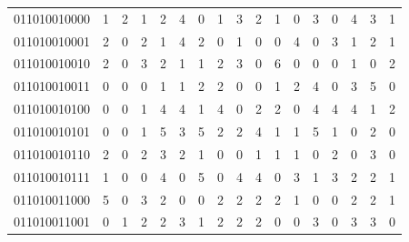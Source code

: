 \documentclass[10pt,a4paper]{article}
\begin{document}
\begin{longtable}{ |c|c|c|c|c|c|c|c|c|c|c|c|c|c|c|c|c| }
    011010010000              & 1                            & 2                                & 1                            & 2                              & 4   & 0   & 1   & 3   & 2   & 1   & 0   & 3   & 0   & 4   & 3   & 1   \\
    011010010001              & 2                            & 0                                & 2                            & 1                              & 4   & 2   & 0   & 1   & 0   & 0   & 4   & 0   & 3   & 1   & 2   & 1   \\
    011010010010              & 2                            & 0                                & 3                            & 2                              & 1   & 1   & 2   & 3   & 0   & 6   & 0   & 0   & 0   & 1   & 0   & 2   \\
    011010010011              & 0                            & 0                                & 0                            & 1                              & 1   & 2   & 2   & 0   & 0   & 1   & 2   & 4   & 0   & 3   & 5   & 0   \\
    011010010100              & 0                            & 0                                & 1                            & 4                              & 4   & 1   & 4   & 0   & 2   & 2   & 0   & 4   & 4   & 4   & 1   & 2   \\
    011010010101              & 0                            & 0                                & 1                            & 5                              & 3   & 5   & 2   & 2   & 4   & 1   & 1   & 5   & 1   & 0   & 2   & 0   \\
    011010010110              & 2                            & 0                                & 2                            & 3                              & 2   & 1   & 0   & 0   & 1   & 1   & 1   & 0   & 2   & 0   & 3   & 0   \\
    011010010111              & 1                            & 0                                & 0                            & 4                              & 0   & 5   & 0   & 4   & 4   & 0   & 3   & 1   & 3   & 2   & 2   & 1   \\
    011010011000              & 5                            & 0                                & 3                            & 2                              & 0   & 0   & 2   & 2   & 2   & 2   & 1   & 0   & 0   & 2   & 2   & 1   \\
    011010011001              & 0                            & 1                                & 2                            & 2                              & 3   & 1   & 2   & 2   & 2   & 0   & 0   & 3   & 0   & 3   & 3   & 0   \\

\end{longtable}
\end{document}
